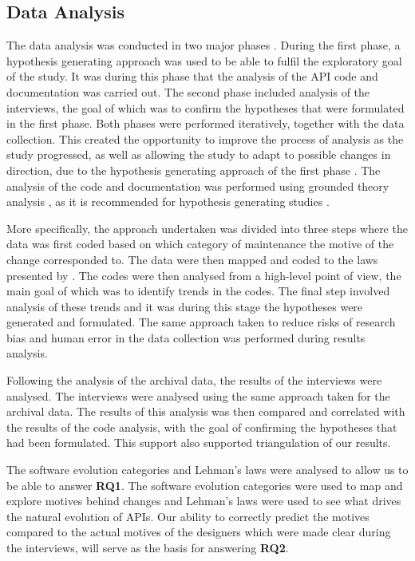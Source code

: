 \documentclass{sig-alternate}
\begin{document}
\subsection{Data Analysis} \label{data_analysis}
The data analysis was conducted in two major phases \cite{andersson2007spiral}. During the first phase, a hypothesis generating approach \cite{seaman1999qualitative} was used to be able to fulfil the exploratory goal of the study. It was during this phase that the analysis of the API code and documentation was carried out. The second phase included analysis of the interviews, the goal of which was to confirm the hypotheses \cite{seaman1999qualitative} that were formulated in the first phase. Both phases were performed iteratively, together with the data collection. This created the opportunity to improve the process of analysis as the study progressed, as well as allowing the study to adapt to possible changes in direction, due to the hypothesis generating approach of the first phase \cite{andersson2007spiral}. The analysis of the code and documentation was performed using grounded theory analysis \cite{seaman1999qualitative}, as it is recommended for hypothesis generating studies \cite{runeson2009guidelines} \cite{seaman1999qualitative}.

More specifically, the approach undertaken was divided into three steps where the data was first coded based on which category of maintenance \cite{chapin2001types} the motive of the change corresponded to. The data were then mapped and coded to the laws presented by \cite{lehman1980programs}. The codes were then analysed from a high-level point of view, the main goal of which was to identify trends in the codes. The final step involved analysis of these trends and it was during this stage the hypotheses were generated and formulated. The same approach taken to reduce risks of research bias and human error in the data collection was performed during results analysis. 

Following the analysis of the archival data, the results of the interviews were analysed. The interviews were analysed using the same approach taken for the archival data. The results of this analysis was then compared and correlated with the results of the code analysis, with the goal of confirming the hypotheses that had been formulated. This support also supported triangulation of our results. 

The software evolution categories \cite{chapin2001types} and Lehman's laws \cite{lehman1980programs} were analysed to allow us to be able to answer \textbf{RQ1}. The software evolution categories were used to map and explore motives behind changes and Lehman's laws were used to see what drives the natural evolution of APIs. Our ability to correctly predict the motives compared to the actual motives of the designers which were made clear during the interviews, will serve as the basis for answering \textbf{RQ2}.
\end{document}
